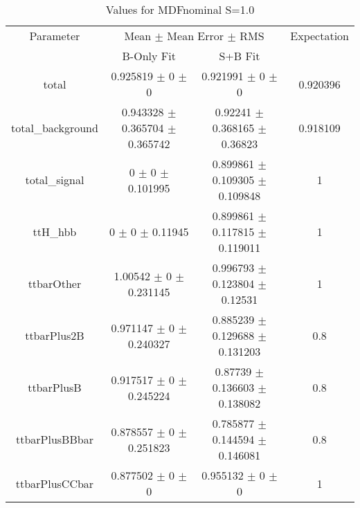 \begin{table}
\centering
\caption{Values for MDFnominal S=1.0}
\begin{tabular}{cccc}
\toprule
Parameter & \multicolumn{2}{c}{Mean $\pm$ Mean Error $\pm$ RMS} & Expectation\\
 & B-Only Fit & S+B Fit & \\
\midrule
total & \num{0.925819} $\pm$ \num{0} $\pm$ \num{0} & \num{0.921991} $\pm$ \num{0} $\pm$ \num{0} & \num{0.920396}\\
total\_background & \num{0.943328} $\pm$ \num{0.365704} $\pm$ \num{0.365742} & \num{0.92241} $\pm$ \num{0.368165} $\pm$ \num{0.36823} & \num{0.918109}\\
total\_signal & \num{0} $\pm$ \num{0} $\pm$ \num{0.101995} & \num{0.899861} $\pm$ \num{0.109305} $\pm$ \num{0.109848} & \num{1}\\
ttH\_hbb & \num{0} $\pm$ \num{0} $\pm$ \num{0.11945} & \num{0.899861} $\pm$ \num{0.117815} $\pm$ \num{0.119011} & \num{1}\\
ttbarOther & \num{1.00542} $\pm$ \num{0} $\pm$ \num{0.231145} & \num{0.996793} $\pm$ \num{0.123804} $\pm$ \num{0.12531} & \num{1}\\
ttbarPlus2B & \num{0.971147} $\pm$ \num{0} $\pm$ \num{0.240327} & \num{0.885239} $\pm$ \num{0.129688} $\pm$ \num{0.131203} & \num{0.8}\\
ttbarPlusB & \num{0.917517} $\pm$ \num{0} $\pm$ \num{0.245224} & \num{0.87739} $\pm$ \num{0.136603} $\pm$ \num{0.138082} & \num{0.8}\\
ttbarPlusBBbar & \num{0.878557} $\pm$ \num{0} $\pm$ \num{0.251823} & \num{0.785877} $\pm$ \num{0.144594} $\pm$ \num{0.146081} & \num{0.8}\\
ttbarPlusCCbar & \num{0.877502} $\pm$ \num{0} $\pm$ \num{0} & \num{0.955132} $\pm$ \num{0} $\pm$ \num{0} & \num{1}\\
\bottomrule
\end{tabular}
\end{table}